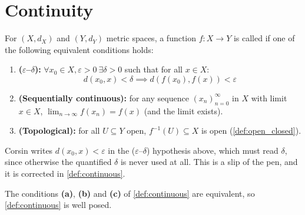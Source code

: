 
\section{Continuity}
\label{sec:continuity}

\begin{definition}
\label{def:continuous}
For $(X, d_X)$ and $(Y, d_Y)$ metric spaces, a function $f : X \to Y$ is called 
 if one of the following equivalent conditions holds:
\begin{enumerate}[label=\textbf{(\alph*)}]
  \item \textbf{($\varepsilon$--$\delta$):} $\forall x_0 \in X, \varepsilon > 0 \ \exists \delta > 0$ such that for all $x \in X$:
    \[d(x_0, x) < \delta \implies d(f(x_0), f(x)) < \varepsilon\]
  \item \textbf{(Sequentially continuous):} for any sequence $(x_n)_{n=0}^{\infty}$ in $X$ with
    limit $x \in X$, $\lim_{n\to\infty} f(x_n) = f(x)$ (and the limit exists).
  \item \textbf{(Topological):} for all $U \subseteq Y$ open, $f^{-1}(U) \subseteq X$ is open
    (\cref{def:open_closed}).
\end{enumerate}
\end{definition}

\begin{ainote}
Corsin writes $d(x_0,x) < \varepsilon$ in the ($\varepsilon$--$\delta$) hypothesis above, which
must read $\delta$, since otherwise the quantified $\delta$ is never used at all. This is a slip
of the pen, and it is corrected in \cref{def:continuous}.
\end{ainote}

\begin{proposition}
\label{prop:continuity_equivalences}
The conditions \textbf{(a)}, \textbf{(b)} and \textbf{(c)} of \cref{def:continuous} are
equivalent, so \cref{def:continuous} is well posed.
\end{proposition}

